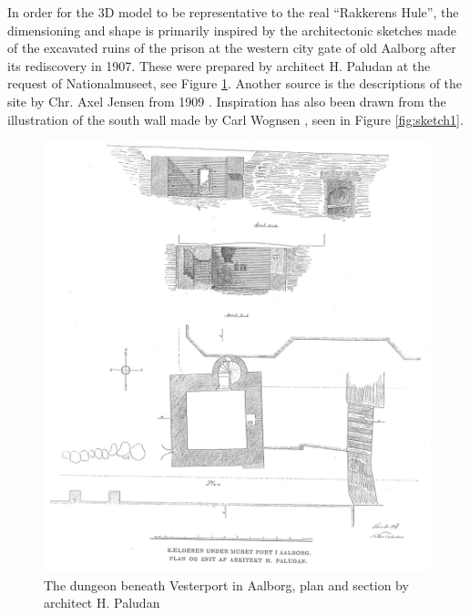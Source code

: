 In order for the 3D model to be representative to the real “Rakkerens Hule”, the dimensioning and shape is primarily inspired by the architectonic sketches made of the excavated ruins of the prison at the western city gate of old Aalborg after its rediscovery in 1907. These were prepared by architect H. Paludan at the request of Nationalmuseet, see Figure \ref{fig:sketch0}. Another source is the descriptions of the site by Chr. Axel Jensen from 1909 \cite{Jensen1909}. Inspiration has also been drawn from the illustration of the south wall made by Carl Wognsen \cite{Riismoller1961}, seen in Figure \ref{fig:sketch1}.

\begin{figure}
    \centering
    \includegraphics[width=\textwidth]{figures/sketch0.jpg}
	\caption{The dungeon beneath Vesterport in Aalborg, plan and section by architect H. Paludan \cite{Jensen1909}}\label{fig:sketch0}
\end{figure}

